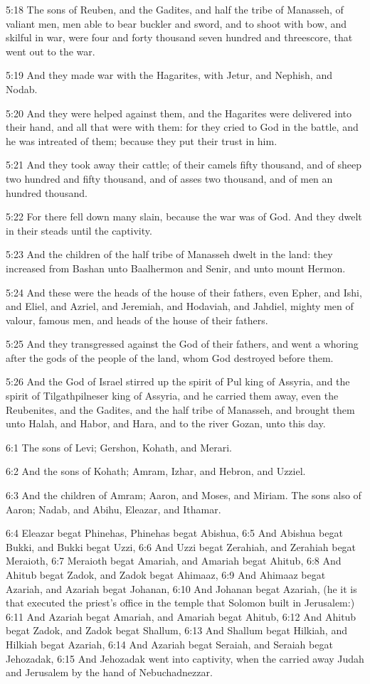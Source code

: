 5:18 The sons of Reuben, and the Gadites, and half the tribe of
Manasseh, of valiant men, men able to bear buckler and sword, and to
shoot with bow, and skilful in war, were four and forty thousand seven
hundred and threescore, that went out to the war.

5:19 And they made war with the Hagarites, with Jetur, and Nephish,
and Nodab.

5:20 And they were helped against them, and the Hagarites were
delivered into their hand, and all that were with them: for they cried
to God in the battle, and he was intreated of them; because they put
their trust in him.

5:21 And they took away their cattle; of their camels fifty thousand,
and of sheep two hundred and fifty thousand, and of asses two
thousand, and of men an hundred thousand.

5:22 For there fell down many slain, because the war was of God. And
they dwelt in their steads until the captivity.

5:23 And the children of the half tribe of Manasseh dwelt in the land:
they increased from Bashan unto Baalhermon and Senir, and unto mount
Hermon.

5:24 And these were the heads of the house of their fathers, even
Epher, and Ishi, and Eliel, and Azriel, and Jeremiah, and Hodaviah,
and Jahdiel, mighty men of valour, famous men, and heads of the house
of their fathers.

5:25 And they transgressed against the God of their fathers, and went
a whoring after the gods of the people of the land, whom God destroyed
before them.

5:26 And the God of Israel stirred up the spirit of Pul king of
Assyria, and the spirit of Tilgathpilneser king of Assyria, and he
carried them away, even the Reubenites, and the Gadites, and the half
tribe of Manasseh, and brought them unto Halah, and Habor, and Hara,
and to the river Gozan, unto this day.

6:1 The sons of Levi; Gershon, Kohath, and Merari.

6:2 And the sons of Kohath; Amram, Izhar, and Hebron, and Uzziel.

6:3 And the children of Amram; Aaron, and Moses, and Miriam. The sons
also of Aaron; Nadab, and Abihu, Eleazar, and Ithamar.

6:4 Eleazar begat Phinehas, Phinehas begat Abishua, 6:5 And Abishua
begat Bukki, and Bukki begat Uzzi, 6:6 And Uzzi begat Zerahiah, and
Zerahiah begat Meraioth, 6:7 Meraioth begat Amariah, and Amariah begat
Ahitub, 6:8 And Ahitub begat Zadok, and Zadok begat Ahimaaz, 6:9 And
Ahimaaz begat Azariah, and Azariah begat Johanan, 6:10 And Johanan
begat Azariah, (he it is that executed the priest's office in the
temple that Solomon built in Jerusalem:) 6:11 And Azariah begat
Amariah, and Amariah begat Ahitub, 6:12 And Ahitub begat Zadok, and
Zadok begat Shallum, 6:13 And Shallum begat Hilkiah, and Hilkiah begat
Azariah, 6:14 And Azariah begat Seraiah, and Seraiah begat Jehozadak,
6:15 And Jehozadak went into captivity, when the \LORD carried away
Judah and Jerusalem by the hand of Nebuchadnezzar.

